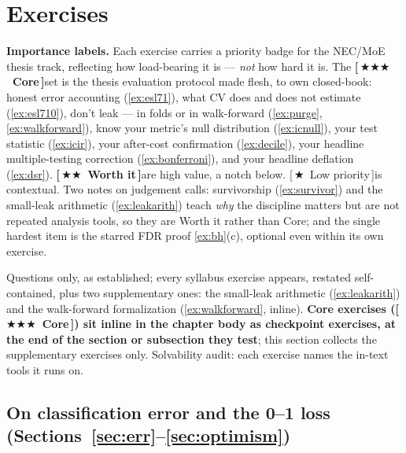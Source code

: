 \documentclass[11pt]{article}
\numberwithin{equation}{section}
\theoremstyle{plain}
\theoremstyle{definition}
\theoremstyle{remark}
\newcounter{exercise}
\newcommand{\prioCore}{{\normalfont\small\textbf{\textcolor{necblue}{[\,\ensuremath{\bigstar\bigstar\bigstar}\ Core\,]}}}\hspace{0.5em}}
\newcommand{\prioWorth}{{\normalfont\small\textbf{\textcolor{finmaroon}{[\,\ensuremath{\bigstar\bigstar}\ Worth it\,]}}}\hspace{0.5em}}
\newcommand{\prioLow}{{\normalfont\small\textcolor{priogray}{[\,\ensuremath{\bigstar}\ Low priority\,]}}\hspace{0.5em}}
\begin{document}
\section{Exercises}\label{sec:exercises}

\noindent\textbf{Importance labels.} Each exercise carries a priority badge for the NEC/MoE thesis track, reflecting how load-bearing it is --- \emph{not} how hard it is. The \prioCore set is the thesis evaluation protocol made flesh, to own closed-book: honest error accounting (\ref{ex:esl71}), what CV does and does not estimate (\ref{ex:esl710}), don't leak --- in folds or in walk-forward (\ref{ex:purge}, \ref{ex:walkforward}), know your metric's null distribution (\ref{ex:icnull}), your test statistic (\ref{ex:icir}), your after-cost confirmation (\ref{ex:decile}), your headline multiple-testing correction (\ref{ex:bonferroni}), and your headline deflation (\ref{ex:dsr}). \prioWorth are high value, a notch below. \prioLow is contextual. Two notes on judgement calls: survivorship (\ref{ex:survivor}) and the small-leak arithmetic (\ref{ex:leakarith}) teach \emph{why} the discipline matters but are not repeated analysis tools, so they are Worth it rather than Core; and the single hardest item is the starred FDR proof \ref{ex:bh}(c), optional even within its own exercise.

Questions only, as established; every syllabus exercise appears, restated self-contained, plus two supplementary ones: the small-leak arithmetic (\ref{ex:leakarith}) and the walk-forward formalization (\ref{ex:walkforward}, inline). \textbf{Core exercises (\prioCore) sit inline in the chapter body as checkpoint exercises, at the end of the section or subsection they test}; this section collects the supplementary exercises only. Solvability audit: each exercise names the in-text tools it runs on.

\subsection*{On classification error and the 0--1 loss (Sections~\ref{sec:err}--\ref{sec:optimism})}
\end{document}
